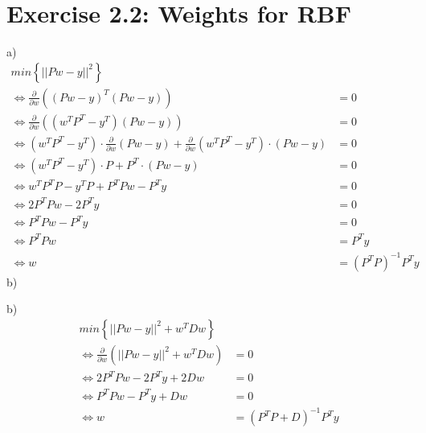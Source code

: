 \documentclass{scrartcl}
\begin{document}
\section{Exercise 2.2: Weights for RBF}

a)
\begin{align*}
  min \left\{ || P w-y ||^2\right\} &\\
 \Leftrightarrow  \frac{\partial}{\partial w} \left( (P w-y)^T (P w-y)\right) & = 0 \\
 \Leftrightarrow  \frac{\partial}{\partial w} \left( (w^T P^T -y^T) (P w-y)\right) & = 0 \\
 \Leftrightarrow  (w^T P^T -y^T) \cdot \frac{\partial}{\partial w} \left( P w-y\right) + \frac{\partial}{\partial w} \left( w^T P^T -y^T \right) \cdot (P w-y) & = 0 \\
 \Leftrightarrow  (w^T P^T -y^T) \cdot  P + P^T \cdot (P w-y) & = 0 \\
 \Leftrightarrow  w^T P^T P - y^T P + P^T P w - P^T y & = 0  \\
 \Leftrightarrow  2 P^T P w - 2 P^T y & = 0 \\
 \Leftrightarrow  P^T P w - P^T y & = 0 \\
 \Leftrightarrow  P^T P w & = P^T y \\
 \Leftrightarrow w & = (P^T P)^{-1} P^T y
\end{align*}
b)


b)
\begin{align*}
      min \left\{ || P w-y ||^2 + w^T D w \right\} &\\
     \Leftrightarrow  \frac{\partial}{\partial w} \left(|| P w-y ||^2 + w^T D w\right) & = 0 \\
     \Leftrightarrow  2 P^T P w - 2 P^T y + 2 D w & = 0 \\
     \Leftrightarrow  P^T P w - P^T y + D w& = 0 \\
     \Leftrightarrow w & = (P^T P + D)^{-1} P^T y
\end{align*}
\end{document}
